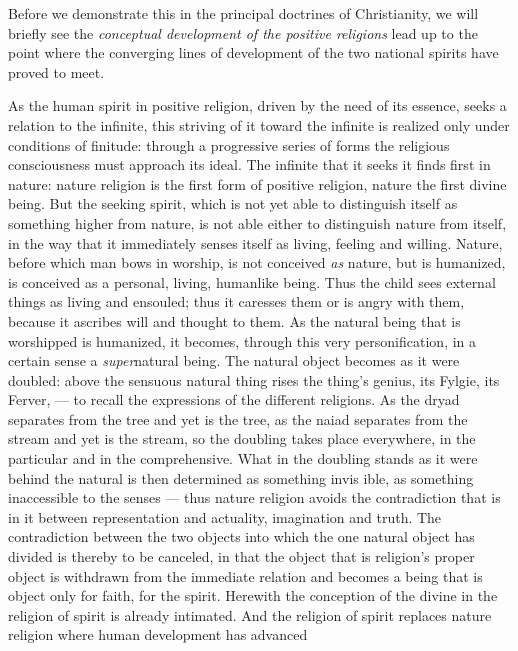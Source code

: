 \documentclass[12pt,a4paper,openany]{book}
\newcommand{\opage}[1]{\marginnote{\footnotesize\textit{[#1]}}}
\begin{document}
Before we demonstrate this in the principal doctrines of Christianity,
we will briefly see the \emph{conceptual
development of the positive religions} lead up to the point where the converging
lines of development of the two national spirits have proved to
meet.

As the human spirit in positive religion, driven by
the need of its essence, seeks a relation to the infinite,
this striving of it toward the infinite is realized only under conditions of finitude:
through a progressive series of forms
the religious consciousness must approach its ideal. The
infinite that it seeks it finds first in nature: nature religion
is the first form of positive religion, nature
the first divine being. But the seeking spirit, which
is not yet able to distinguish itself as something higher from
nature, is not able either to distinguish nature from itself, in the way
that it immediately senses itself as living,
feeling and willing. Nature, before which man bows
in worship, is not conceived \emph{as} nature, but is
humanized, is conceived as a personal, living,
humanlike being. Thus the child sees external things
as living and ensouled; thus it caresses them or
is angry with them, because it ascribes will and thought to them.
As the natural being that is worshipped is humanized,
it becomes, through this very personification, in a certain sense a
\emph{super}natural being. The natural object becomes as it were doubled:
above the sensuous natural thing rises the thing's
genius, its Fylgie, its Ferver, --- to recall the
expressions of the different religions. As the dryad separates from
the tree and yet is the tree, as the naiad separates from the stream
and yet is the stream, so the doubling takes place everywhere, in
the particular and in the comprehensive. What in the doubling stands
as it were behind the natural is then determined as something invis%
\opage{448}ible, as something inaccessible to the senses --- thus
nature religion avoids the contradiction that is in it between
representation and actuality, imagination and truth. The contradiction
between the two objects into which the one natural object
has divided is thereby to be canceled, in that the object that is religion's
proper object is withdrawn from the immediate
relation and becomes a being that is object only for faith,
for the spirit. Herewith the conception of the divine in the religion of spirit
is already intimated. And the religion of spirit replaces
nature religion where human development has advanced
\end{document}

